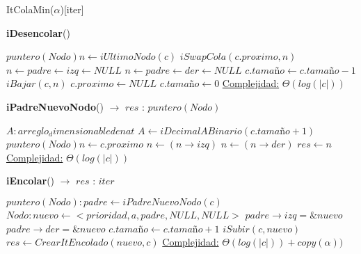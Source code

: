 \begin{Estructura}{ItColaMin($\alpha$)}[iter]
\begin{algorithm}[H]{\textbf{iDesencolar}()}
    	\begin{algorithmic}[1]
			\State $puntero(Nodo) n \gets iUltimoNodo(c)$ 
			\State $iSwapCola(c.proximo, n) $ 
					\State $n \leftarrow padre \leftarrow izq \gets NULL $
				\Else
					\State $n \leftarrow padre \leftarrow der \gets NULL $
				\EndIf	
				\State $c.tamaño \gets c.tamaño - 1$ 						
				\State $iBajar(c,n) $ 
			\Else
				\State $c.proximo \gets NULL $
				\State $c.tamaño \gets 0$ 						
			\EndIf
			\medskip
			\Statex \underline{Complejidad:} $\Theta(log(|c|))$
    	\end{algorithmic}
\end{algorithm}

\begin{algorithm}[H]{\textbf{iPadreNuevoNodo}() $\to$ $res$ : $puntero(Nodo)$}
    	\begin{algorithmic}[1]
			\State $A: arreglo_dimensionable de nat$ 
			\State $A \gets iDecimalABinario(c.tamaño + 1) $ 
			\State $puntero(Nodo) n \gets c.proximo$ 
			 
					\State $n \gets (n \rightarrow izq)$ 
				\Else
					\State $n \gets (n \rightarrow der)$ 
				\EndIf
			\EndFor
			\State $res \gets n$ 
    	\medskip
		\Statex \underline{Complejidad:} $\Theta(log(|c|))$
    	\end{algorithmic}
\end{algorithm}

\begin{algorithm}[H]{\textbf{iEncolar}()  $\to$ $res$ : $iter$ }
    	\begin{algorithmic}[1]
			\State $puntero(Nodo): padre \gets iPadreNuevoNodo(c)$ 
			\State $Nodo: nuevo \gets <prioridad, a, padre, NULL, NULL> $ 						
			 
				\State $padre \rightarrow izq = \& nuevo$ 
			\Else
				\State $padre \rightarrow der = \& nuevo$ 
			\EndIf			
			\State $c.tamaño \gets c.tamaño + 1$ 						
			\State $iSubir(c, nuevo) $ 
			\State $res \gets CrearItEncolado(nuevo, c) $ 
			\medskip
			\Statex \underline{Complejidad:} $\Theta(log(|c|)) + copy(\alpha))$
    	\end{algorithmic}
\end{algorithm}
    	

\end{Estructura}
